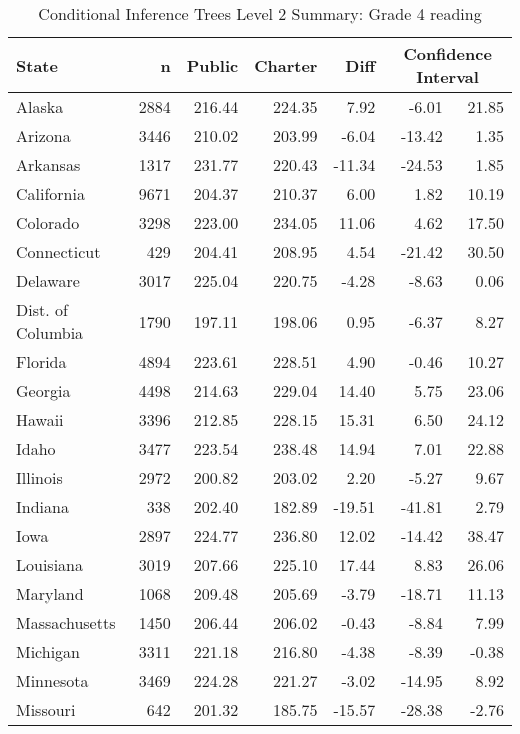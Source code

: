 \begin{table}[ht]
\begin{center}
\caption{Conditional Inference Trees Level 2 Summary: Grade 4 reading}
\label{g4readingtreelevel2}
\begin{tabular}{lrrrrrr}
  \hline
  State & n & Public & Charter & Diff & \multicolumn{2}{c}{Confidence Interval} \\ \hline
Alaska & 2884 & 216.44 & 224.35 & 7.92 & -6.01 & 21.85 \\ 
  Arizona & 3446 & 210.02 & 203.99 & -6.04 & -13.42 & 1.35 \\ 
  Arkansas & 1317 & 231.77 & 220.43 & -11.34 & -24.53 & 1.85 \\ 
  California & 9671 & 204.37 & 210.37 & 6.00 & 1.82 & 10.19 \\ 
  Colorado & 3298 & 223.00 & 234.05 & 11.06 & 4.62 & 17.50 \\ 
  Connecticut & 429 & 204.41 & 208.95 & 4.54 & -21.42 & 30.50 \\ 
  Delaware & 3017 & 225.04 & 220.75 & -4.28 & -8.63 & 0.06 \\ 
  Dist. of Columbia & 1790 & 197.11 & 198.06 & 0.95 & -6.37 & 8.27 \\ 
  Florida & 4894 & 223.61 & 228.51 & 4.90 & -0.46 & 10.27 \\ 
  Georgia & 4498 & 214.63 & 229.04 & 14.40 & 5.75 & 23.06 \\ 
  Hawaii & 3396 & 212.85 & 228.15 & 15.31 & 6.50 & 24.12 \\ 
  Idaho & 3477 & 223.54 & 238.48 & 14.94 & 7.01 & 22.88 \\ 
  Illinois & 2972 & 200.82 & 203.02 & 2.20 & -5.27 & 9.67 \\ 
  Indiana & 338 & 202.40 & 182.89 & -19.51 & -41.81 & 2.79 \\ 
  Iowa & 2897 & 224.77 & 236.80 & 12.02 & -14.42 & 38.47 \\ 
  Louisiana & 3019 & 207.66 & 225.10 & 17.44 & 8.83 & 26.06 \\ 
  Maryland & 1068 & 209.48 & 205.69 & -3.79 & -18.71 & 11.13 \\ 
  Massachusetts & 1450 & 206.44 & 206.02 & -0.43 & -8.84 & 7.99 \\ 
  Michigan & 3311 & 221.18 & 216.80 & -4.38 & -8.39 & -0.38 \\ 
  Minnesota & 3469 & 224.28 & 221.27 & -3.02 & -14.95 & 8.92 \\ 
  Missouri & 642 & 201.32 & 185.75 & -15.57 & -28.38 & -2.76 \\ 

\end{tabular}
\end{center}
\end{table}
